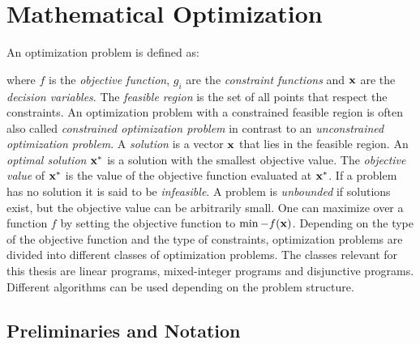 \section{Mathematical Optimization}


An optimization problem is defined as:

where  $f$ is the \textit{objective function}, $g_i$ are the \textit{constraint functions} and $\bold x$ are the \textit{decision variables}. \cite{boyd_stephen_convex_2004}
The \textit{feasible region} is the set of all points that respect the constraints. An optimization problem with a constrained feasible region is often also called \textit{constrained optimization problem} in contrast to an \textit{unconstrained optimization problem}. A \textit{solution} is a vector $\bold x$ that lies in the feasible region. An \textit{optimal solution} $\bold x^*$ is a solution with the smallest objective value. The \textit{objective value} of $\bold x^*$ is the value of the objective function evaluated at $\bold x^*$. If a problem has no solution it is said to be \textit{infeasible}. A problem is \textit{unbounded} if solutions exist, but the objective value can be arbitrarily small.
One can maximize over a function $f$ by setting the objective function to $\min -f(\bold x)$.
Depending on the type of the objective function and the type of constraints, optimization problems are divided into different classes of optimization problems. The classes relevant for this thesis are linear programs, mixed-integer programs and disjunctive programs. 
Different algorithms can be used depending on the problem structure.

\subsection{Preliminaries and Notation}

